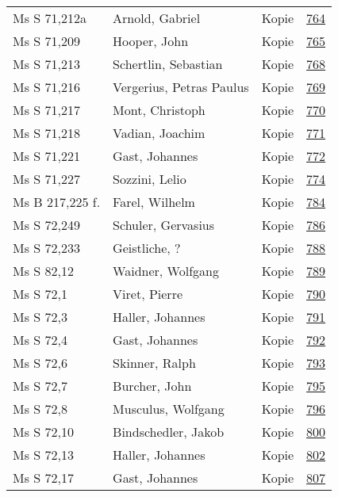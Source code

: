 \documentclass[10pt,a4paper,landscape]{report}
\begin{document}
\begin{longtable}{p{16cm}p{4cm}lr}
Ms S 71,212a	&	Arnold, Gabriel	&	Kopie	&	\href{http://130.60.24.72/assignment/764}{764}\\
Ms S 71,209	&	Hooper, John	&	Kopie	&	\href{http://130.60.24.72/assignment/765}{765}\\
Ms S 71,213	&	Schertlin, Sebastian	&	Kopie	&	\href{http://130.60.24.72/assignment/768}{768}\\
Ms S 71,216	&	Vergerius, Petras Paulus	&	Kopie	&	\href{http://130.60.24.72/assignment/769}{769}\\
Ms S 71,217	&	Mont, Christoph	&	Kopie	&	\href{http://130.60.24.72/assignment/770}{770}\\
Ms S 71,218	&	Vadian, Joachim	&	Kopie	&	\href{http://130.60.24.72/assignment/771}{771}\\
Ms S 71,221	&	Gast, Johannes	&	Kopie	&	\href{http://130.60.24.72/assignment/772}{772}\\
Ms S 71,227	&	Sozzini, Lelio	&	Kopie	&	\href{http://130.60.24.72/assignment/774}{774}\\
Ms B 217,225 f.	&	Farel, Wilhelm	&	Kopie	&	\href{http://130.60.24.72/assignment/784}{784}\\
Ms S 72,249	&	Schuler, Gervasius	&	Kopie	&	\href{http://130.60.24.72/assignment/786}{786}\\
Ms S 72,233	&	Geistliche, ?	&	Kopie	&	\href{http://130.60.24.72/assignment/788}{788}\\
Ms S 82,12	&	Waidner, Wolfgang	&	Kopie	&	\href{http://130.60.24.72/assignment/789}{789}\\
Ms S 72,1	&	Viret, Pierre	&	Kopie	&	\href{http://130.60.24.72/assignment/790}{790}\\
Ms S 72,3	&	Haller, Johannes	&	Kopie	&	\href{http://130.60.24.72/assignment/791}{791}\\
Ms S 72,4	&	Gast, Johannes	&	Kopie	&	\href{http://130.60.24.72/assignment/792}{792}\\
Ms S 72,6	&	Skinner, Ralph	&	Kopie	&	\href{http://130.60.24.72/assignment/793}{793}\\
Ms S 72,7	&	Burcher, John	&	Kopie	&	\href{http://130.60.24.72/assignment/795}{795}\\
Ms S 72,8	&	Musculus, Wolfgang	&	Kopie	&	\href{http://130.60.24.72/assignment/796}{796}\\
Ms S 72,10	&	Bindschedler, Jakob	&	Kopie	&	\href{http://130.60.24.72/assignment/800}{800}\\
Ms S 72,13	&	Haller, Johannes	&	Kopie	&	\href{http://130.60.24.72/assignment/802}{802}\\
Ms S 72,17	&	Gast, Johannes	&	Kopie	&	\href{http://130.60.24.72/assignment/807}{807}\\

\end{longtable}
\end{document}

